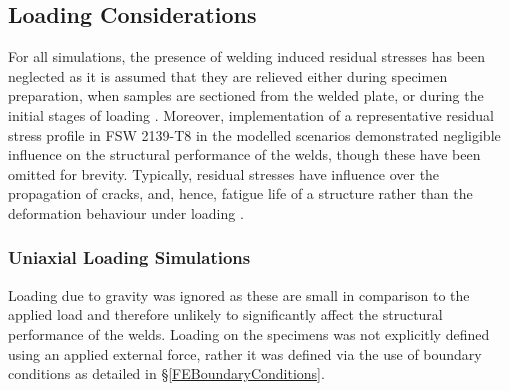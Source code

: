 \subsection{Loading Considerations}
\label{FELoadingConsiderations}
For all simulations, the presence of welding induced residual stresses has been neglected as it is assumed that they are relieved either during specimen preparation, when samples are sectioned from the welded plate, or during the initial stages of loading \cite{Peel2003}. Moreover, implementation of a representative residual stress profile in FSW 2139-T8 \cite{Grujicic2011a} in the modelled scenarios demonstrated negligible influence on the structural performance of the welds, though these have been omitted for brevity. Typically, residual stresses have influence over the propagation of cracks, and, hence, fatigue life of a structure rather than the deformation behaviour under loading \cite{Jata2000}. 
\subsubsection{Uniaxial Loading Simulations}
\label{FEUniaxialTension}
Loading due to gravity was ignored as these are small in comparison to the applied load and therefore unlikely to significantly affect the structural performance of the welds. Loading on the specimens was not explicitly defined using an applied external force, rather it was defined via the use of boundary conditions as detailed in \S\ref{FEBoundaryConditions}.
